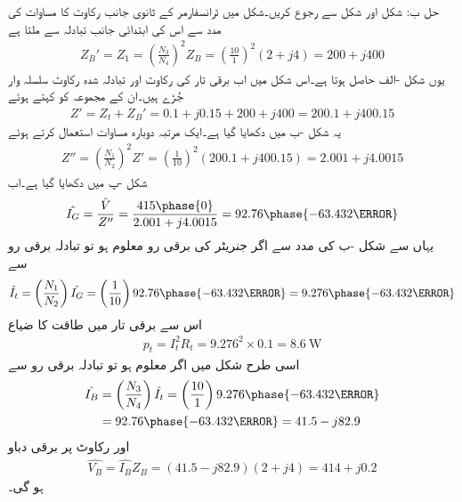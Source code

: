 حل ب:
شکل  اور شکل   سے رجوع کریں۔شکل   میں ٹرانسفارمر  کے ثانوی جانب رکاوٹ کا مساوات   کی مدد سے اس کی ابتدائی جانب تبادلہ سے ملتا ہے
\begin{align*}
Z_B'=Z_1=\left(\frac{N_3}{N_4} \right)^2 Z_B=\left(\frac{10}{1} \right)^2 \left(2+j 4 \right)=200+j 400
\end{align*}
یوں شکل -الف حاصل ہوتا ہے۔اس شکل میں اب برقی تار کی رکاوٹ اور  تبادلہ شدہ رکاوٹ سلسلہ وار جُڑے ہیں۔ان کے مجموعہ  کو  کہتے ہوئے
\begin{align*}
Z'=Z_t+Z_B'=0.1+j 0.15+200+j 400=200.1+j400.15
\end{align*}
یہ شکل -ب میں دکھایا گیا ہے۔ایک مرتبہ دوبارہ مساوات   استعمال کرتے ہوئے
\begin{align*}
Z''=\left(\frac{N_1}{N_2} \right)^2 Z'=\left(\frac{1}{10} \right)^2 \left(200.1+j400.15 \right)=2.001+j4.0015
\end{align*}
شکل -پ میں دکھایا گیا ہے۔اب
\begin{align*}
\hat{I_G}=\frac{\hat{V}}{Z''}=\frac{415\phase{0}}{2.001+j4.0015}=92.76\phase{-63.432\degree}
\end{align*}
یہاں سے شکل -ب  کی مدد سے اگر جنریٹر کی برقی رو معلوم ہو تو تبادلہ برقی رو سے
\begin{align*}
\hat{I_t}=\left(\frac{N_1}{N_2} \right) \hat{I_G}=\left(\frac{1}{10}\right) 92.76\phase{-63.432\degree}=9.276\phase{-63.432\degree}
\end{align*}
اس سے برقی تار میں طاقت کا ضیاع
\begin{align*}
p_t=I_t^2 R_t=9.276^2  \times 0.1=\SI{8.6}{\watt}
\end{align*}
اسی طرح شکل   میں اگر  معلوم ہو تو تبادلہ برقی رو سے
\begin{align*}
\hat{I_B}&=\left(\frac{N_3}{N_4}\right) \hat{I_t}=\left(\frac{10}{1}\right) 9.276\phase{-63.432\degree}\\
&=92.76\phase{-63.432\degree}=41.5-j 82.9
\end{align*}
اور رکاوٹ پر برقی دباو
\begin{align*}
\hat{V_B}=\hat{I_B} Z_B=\left(41.5-j 82.9 \right) \left(2+j 4 \right)=414+j 0.2
\end{align*}
ہو گی۔

